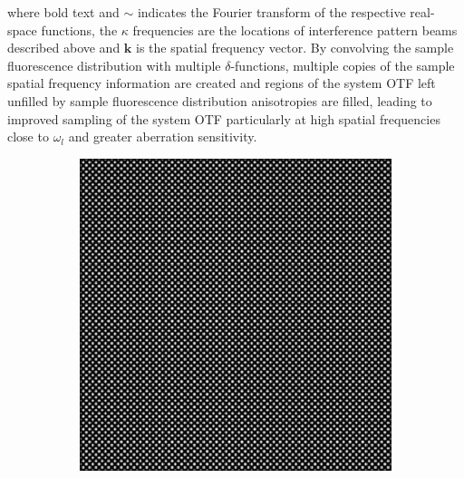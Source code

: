 where bold text and $\sim$ indicates the Fourier transform of the respective real-space functions, the $\kappa$ frequencies are the 
locations of interference pattern beams described above and $\textbf{k}$ is 
the spatial frequency vector. By convolving the sample fluorescence 
distribution with  multiple $\delta$-functions, multiple copies of the 
sample spatial frequency information are created and regions of the 
system OTF left  unfilled by sample fluorescence distribution anisotropies 
are filled, leading to  improved sampling of the system OTF particularly 
at high spatial frequencies close to $\omega_{l}$ and greater aberration 
sensitivity\cite{vzurauskas2019isosense}.

\begin{figure}[h]
	\centering
	\begin{subfigure}{0.4\textwidth}
		\centering
		\includegraphics[width=1\linewidth, scale=0.5]{./images/isosense_visualisation_real.png}
		\caption{}
		\label{fig:isosense_visualisation_real}
	\end{subfigure}
	\begin{subfigure}{0.4\textwidth}
		\centering

\end{subfigure}
\end{figure}
